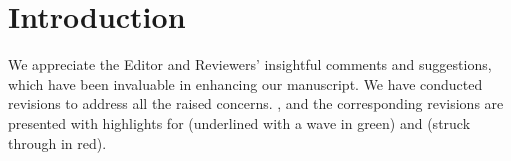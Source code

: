\noindent\hrulefill
{}


\section*{Introduction}
We appreciate the Editor and Reviewers' insightful comments and suggestions, which have been invaluable in enhancing our manuscript. We have conducted revisions to address all the raised concerns.  , and the corresponding revisions are presented with highlights for  (underlined with a wave in green) and  (struck through in red).

